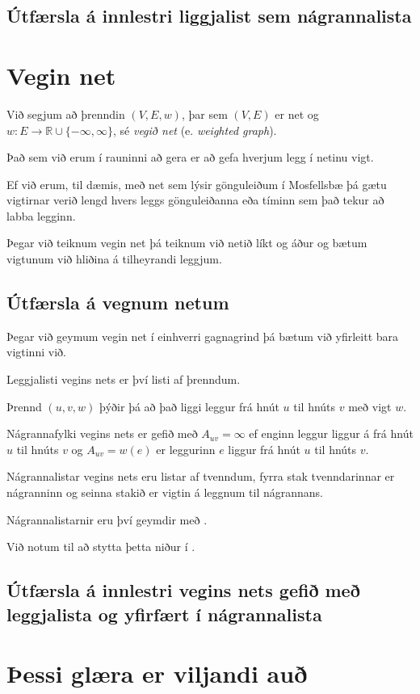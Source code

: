 \subsection{Útfærsla á innlestri liggjalist sem nágrannalista}
{
}

\section{Vegin net}
{
	{
		\item<1-> Við segjum að þrenndin $(V, E, w)$, þar sem $(V, E)$ er net og $w \colon E \rightarrow \mathbb{R} \cup \{-\infty, \infty\}$, sé
					\emph{vegið net} (e. \emph{weighted graph}).
		\item<2-> Það sem við erum í rauninni að gera er að gefa hverjum legg í netinu vigt.
		\item<3-> Ef við erum, til dæmis, með net sem lýsir gönguleiðum í Mosfellsbæ þá gætu vigtirnar verið lengd hvers leggs gönguleiðanna
					eða tíminn sem það tekur að labba legginn.
		\item<4-> Þegar við teiknum vegin net þá teiknum við netið líkt og áður og bætum vigtunum við hliðina á tilheyrandi leggjum.
	}
}

\subsection{Útfærsla á vegnum netum}
{
	{
		\item<1-> Þegar við geymum vegin net í einhverri gagnagrind þá bætum við yfirleitt bara vigtinni við.
		\item<2-> Leggjalisti vegins nets er því listi af þrenndum.
		\item<3-> Þrennd $(u, v, w)$ þýðir þá að það liggi leggur frá hnút $u$ til hnúts $v$ með vigt $w$.
		\item<4-> Nágrannafylki vegins nets er gefið með $A_{uv} = \infty$ ef enginn leggur liggur á frá hnút $u$ til hnúts $v$ og
					$A_{uv} = w(e)$ er leggurinn $e$ liggur frá hnút $u$ til hnúts $v$.
		\item<5-> Nágrannalistar vegins nets eru listar af tvenndum, fyrra stak tvenndarinnar er nágranninn og seinna stakið er vigtin á leggnum
					til nágrannans.
		\item<6-> Nágrannalistarnir eru því geymdir með .
		\item<7-> Við notum  til að stytta þetta niður í .
	}
}

\subsection{Útfærsla á innlestri vegins nets gefið með leggjalista og yfirfært í nágrannalista}
{
}

\section{Þessi glæra er viljandi auð}
{
}


